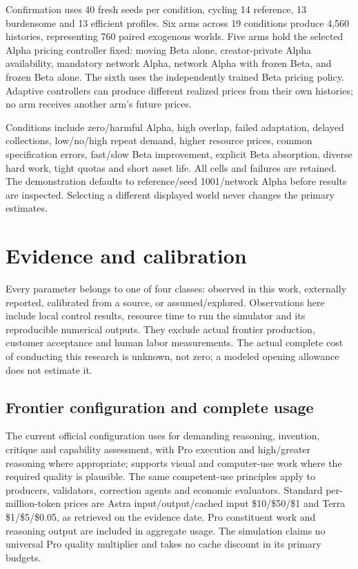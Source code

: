 \documentclass[11pt,letterpaper]{article}
\newcommand{\usd}[1]{\$#1}
\newcommand{\code}[1]{\texttt{\detokenize{#1}}}
\newcommand{\sourceclass}[1]{\textsf{\small #1}}
\begin{document}
Confirmation uses 40 fresh seeds per condition, cycling 14 reference, 13 burdensome and 13 efficient profiles. Six arms across 19 conditions produce 4,560 histories, representing 760 paired exogenous worlds. Five arms hold the selected Alpha pricing controller fixed: moving Beta alone, creator-private Alpha availability, mandatory network Alpha, network Alpha with frozen Beta, and frozen Beta alone. The sixth uses the independently trained Beta pricing policy. Adaptive controllers can produce different realized prices from their own histories; no arm receives another arm's future prices.

Conditions include zero/harmful Alpha, high overlap, failed adaptation, delayed collections, low/no/high repeat demand, higher resource prices, common specification errors, fast/slow Beta improvement, explicit Beta absorption, diverse hard work, tight quotas and short asset life. All cells and failures are retained. The demonstration defaults to reference/seed 1001/network Alpha before results are inspected. Selecting a different displayed world never changes the primary estimates.



\section{Evidence and calibration}

Every parameter belongs to one of four classes: \sourceclass{observed in this work}, \sourceclass{externally reported}, \sourceclass{calibrated from a source}, or \sourceclass{assumed/explored}. Observations here include local control results, resource time to run the simulator and its reproducible numerical outputs. They exclude actual frontier production, customer acceptance and human labor measurements. The actual complete cost of conducting this research is unknown, not zero; a modeled opening allowance does not estimate it.

\subsection{Frontier configuration and complete usage}

The current official configuration uses \code{gpt-6-astra} for demanding reasoning, invention, critique and capability assessment, with Pro execution and high/greater reasoning where appropriate; \code{gpt-6.1-terra} supports visual and computer-use work where the required quality is plausible. The same competent-use principles apply to producers, validators, correction agents and economic evaluators. Standard per-million-token prices are Astra input/output/cached input \usd{10}/\usd{50}/\usd{1} and Terra \usd{1}/\usd{5}/\usd{0.05}, as retrieved on the evidence date. Pro constituent work and reasoning output are included in aggregate usage. The simulation claims no universal Pro quality multiplier and takes no cache discount in its primary budgets.\cite{models,pricing}
\end{document}
